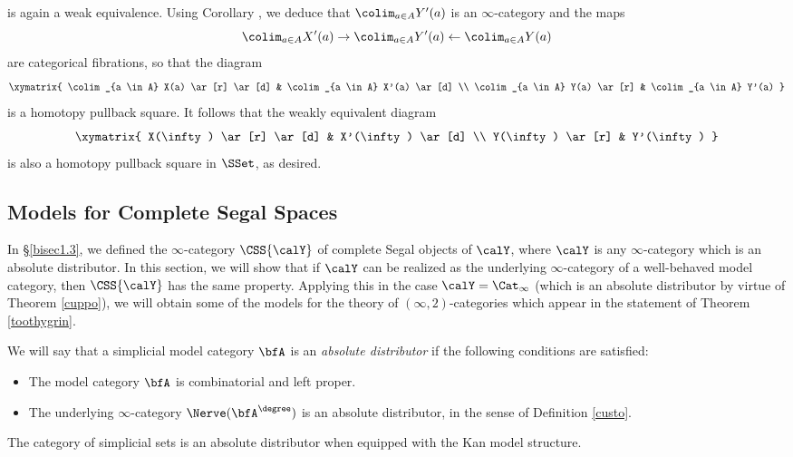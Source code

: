 \begin{remark}
is again a weak equivalence. Using Corollary , we deduce that
$\colim_{a \in A} Y'(a)$ is an $\infty$-category and the maps
$$ \colim_{a \in A} X'(a) \rightarrow \colim_{a \in A} Y'(a) \leftarrow \colim_{a \in A} Y(a)$$
are categorical fibrations, so that the diagram
$$ \xymatrix{ \colim_{a \in A} X(a) \ar[r] \ar[d] & \colim_{a \in A} X'(a) \ar[d] \\
\colim_{a \in A} Y(a) \ar[r] & \colim_{a \in A} Y'(a) }$$
is a homotopy pullback square. It follows that the weakly equivalent diagram
$$ \xymatrix{ X(\infty) \ar[r] \ar[d] & X'(\infty) \ar[d] \\
Y(\infty) \ar[r] & Y'(\infty) }$$
is also a homotopy pullback square in $\SSet$, as desired.
\end{remark}

\subsection{Models for Complete Segal Spaces}\label{bisec1.5}

In \S \ref{bisec1.3}, we defined the $\infty$-category
$\CSS{\calY}$ of complete Segal objects of $\calY$, where $\calY$
is any $\infty$-category which is an absolute distributor. In this section, we will show that
if $\calY$ can be realized as the underlying $\infty$-category of a well-behaved model category, then
$\CSS{\calY}$ has the same property. Applying this in the case $\calY = \Cat_{\infty}$
(which is an absolute distributor by virtue of Theorem \ref{cuppo}), we will obtain some of
the models for the theory of $(\infty,2)$-categories which appear in the statement of
Theorem \ref{toothygrin}.

\begin{definition}\label{kayloo}
We will say that a simplicial model category $\bfA$ is an {\it absolute distributor} if the following
conditions are satisfied:
\begin{itemize}
\item[$(1)$] The model category $\bfA$ is combinatorial and left proper.
\item[$(2)$] The underlying $\infty$-category $\Nerve( \bfA^{\degree})$ is an
absolute distributor, in the sense of Definition \ref{custo}.
\end{itemize}
\end{definition}

\begin{example}
The category of simplicial sets is an absolute distributor when equipped with the Kan model structure.
\end{example}

